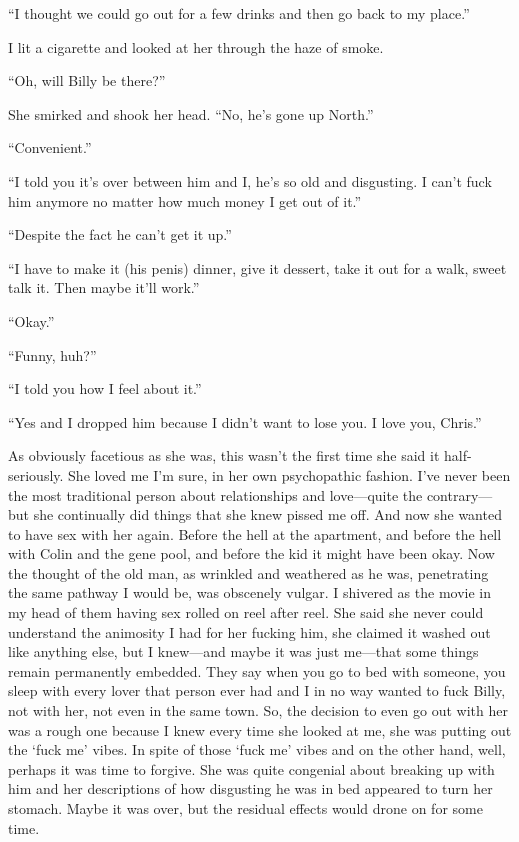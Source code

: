 ``I thought we could go out for a few drinks and then go back to my
place.''

I lit a cigarette and looked at her through the haze of smoke.

``Oh, will Billy be there?''

She smirked and shook her head. ``No, he's gone up North.''

``Convenient.''

``I told you it's over between him and I, he's so old and disgusting. I
can't fuck him anymore no matter how much money I get out of it.''

``Despite the fact he can't get it up.''

``I have to make it (his penis) dinner, give it dessert, take it out for
a walk, sweet talk it. Then maybe it'll work.''

``Okay.''

``Funny, huh?''

``I told you how I feel about it.''

``Yes and I dropped him because I didn't want to lose you. I love you,
Chris.''

As obviously facetious as she was, this wasn't the first time she said
it half-seriously. She loved me I'm sure, in her own psychopathic
fashion. I've never been the most traditional person about relationships
and love---quite the contrary---but she continually did things that she
knew pissed me off. And now she wanted to have sex with her again.
Before the hell at the apartment, and before the hell with Colin and the
gene pool, and before the kid it might have been okay. Now the thought
of the old man, as wrinkled and weathered as he was, penetrating the
same pathway I would be, was obscenely vulgar. I shivered as the movie
in my head of them having sex rolled on reel after reel. She said she
never could understand the animosity I had for her fucking him, she
claimed it washed out like anything else, but I knew---and maybe it was
just me---that some things remain permanently embedded. They say when
you go to bed with someone, you sleep with every lover that person ever
had and I in no way wanted to fuck Billy, not with her, not even in the
same town. So, the decision to even go out with her was a rough one
because I knew every time she looked at me, she was putting out the
`fuck me' vibes. In spite of those `fuck me' vibes and on the other
hand, well, perhaps it was time to forgive. She was quite congenial
about breaking up with him and her descriptions of how disgusting he was
in bed appeared to turn her stomach. Maybe it was over, but the residual
effects would drone on for some time.

